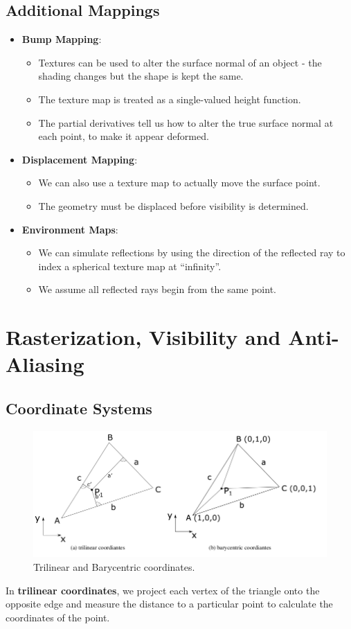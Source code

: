 \documentclass[11pt]{article}
\begin{document}
\subsection{Additional Mappings}
\begin{itemize}
  \item \textbf{Bump Mapping}:
    \begin{itemize}
      \item Textures can be used to alter the surface normal of an object - the shading changes but the shape is kept the same.
      \item The texture map is treated as a single-valued height function.
      \item The partial derivatives tell us how to alter the true surface normal at each point, to make it appear deformed.
    \end{itemize}
  \item \textbf{Displacement Mapping}:
    \begin{itemize}
      \item We can also use a texture map to actually move the surface point.
      \item The geometry must be displaced before visibility is determined.
    \end{itemize}
  \item \textbf{Environment Maps}:
    \begin{itemize}
      \item We can simulate reflections by using the direction of the reflected ray to index a spherical texture map at ``infinity''.
      \item We assume all reflected rays begin from the same point.
    \end{itemize}
\end{itemize}

\section{Rasterization, Visibility and Anti-Aliasing}

\subsection{Coordinate Systems}
\begin{figure}[htb!]
  \centering
  \caption{Trilinear and Barycentric coordinates.}
  \includegraphics[scale=0.3]{tribary}
\end{figure}
In \textbf{trilinear coordinates}, we project each vertex of the triangle onto the opposite edge and measure the distance to a particular point to calculate the coordinates of the point.
\end{document}
